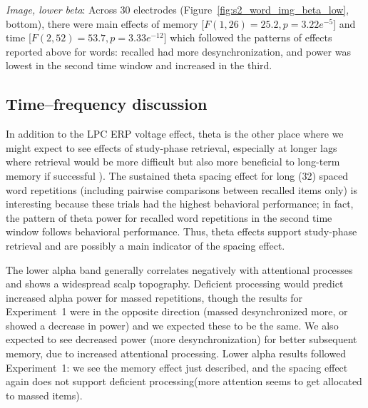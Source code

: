 \textit{Image, lower beta}: Across 30 electrodes (Figure~\ref{fig:s2_word_img_beta_low}, bottom), there were main effects of memory [$F(1,26)=25.2, p=3.22e^{-5}$] and time [$F(2,52)=53.7, p=3.33e^{-12}$] which followed the patterns of effects reported above for words: recalled had more desynchronization, and power was lowest in the second time window and increased in the third.

\subsection{Time--frequency discussion}


In addition to the LPC ERP voltage effect, theta is the other place where we might expect to see effects of study-phase retrieval,
especially at longer lags where retrieval would be more difficult but also more beneficial to long-term memory if successful
\cite{DelaEtal2010,PavlAnde2005}).
The sustained theta spacing effect for long (32) spaced word repetitions (including pairwise comparisons between recalled items only) is interesting because these trials had the highest behavioral performance; in fact, the pattern of theta power for recalled word repetitions in the second time window follows behavioral performance.  Thus, theta effects support study-phase retrieval and are possibly a main indicator of the spacing effect.



The lower alpha band generally correlates negatively with attentional processes and shows a widespread scalp topography.  Deficient processing would predict increased alpha power for massed repetitions, though the results for Experiment~1 were in the opposite direction (massed desynchronized more, or showed a decrease in power) and we expected these to be the same.  We also expected to see decreased power (more desynchronization) for better subsequent memory, due to increased attentional processing.
Lower alpha results followed Experiment~1: we see the memory effect just described, and the spacing effect again does not support deficient processing(more attention seems to get allocated to massed items).


